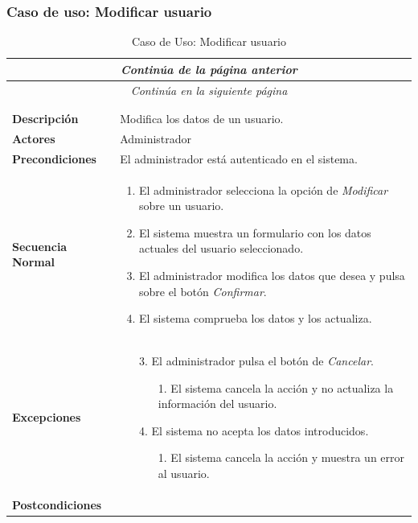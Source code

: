\newpage
\subsubsection*{Caso de uso: Modificar usuario }
\begin{longtable}{| p{4cm} | p{10cm} |}
\endfirsthead
\multicolumn{2}{c}{\textit{Continúa de la página anterior}}\\[12pt]
\hline
\endhead
\hline
\multicolumn{2}{c}{\textit{Continúa en la siguiente página}} \\
\endfoot
\hline
\caption{Caso de Uso: Modificar usuario}\label{fig:1}\\
\endlastfoot


\hline
\multicolumn{2}{|c|}{\textbf{CU$<$24$>$ - Modificar Usuario}} \\

\hline
\textbf{Descripción} &
Modifica los datos de un usuario.\\

\hline
\textbf{Actores} &
Administrador\\

\hline
\textbf{Precondiciones} &
El administrador está autenticado en el sistema.\\

\hline
\textbf{Secuencia Normal} &\mbox{}\par\vspace{-\baselineskip}
\begin{enumerate}[leftmargin=0.7cm, topsep=0.1cm]
\item El administrador selecciona la opción de \textit{Modificar} sobre un usuario.
\item El sistema muestra un formulario con los datos actuales del usuario seleccionado.
\item El administrador modifica los datos que desea y pulsa sobre el botón \textit{Confirmar}.
\item El sistema comprueba los datos y los actualiza.
\end{enumerate}


\\
\hline
\textbf{Excepciones} &\mbox{}\par\vspace{-\baselineskip}
\begin{enumerate}[leftmargin=0.9cm, topsep=0.1cm]
\item[3.] El administrador pulsa el botón de \textit{Cancelar}.
	\begin{itemize}
	\item[1.] El sistema cancela la acción y no actualiza la información del usuario.
	\end{itemize}
\item[4.] El sistema no acepta los datos introducidos.
	\begin{itemize}
	\item[1.] El sistema cancela la acción y muestra un error al usuario.
	\end{itemize}
\end{enumerate}
\\

\hline
\textbf{Postcondiciones} & \\
\hline
\end{longtable}
